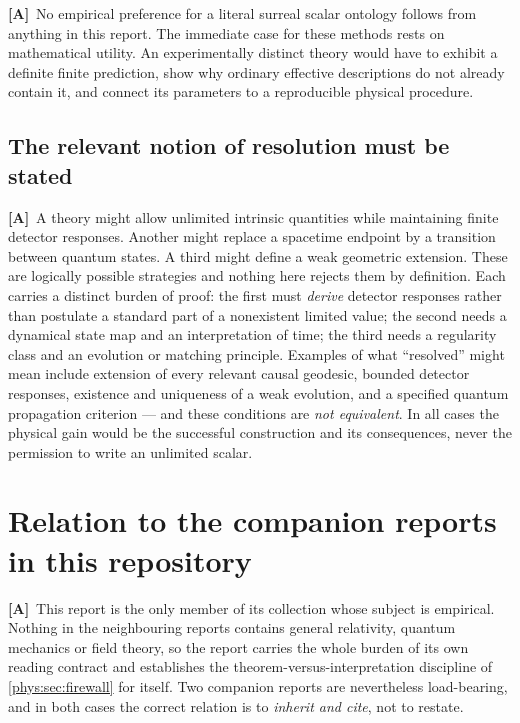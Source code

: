 \documentclass[11pt,letterpaper]{article}
\numberwithin{equation}{section}
\theoremstyle{definition}
\theoremstyle{remark}
\newcommand{\TA}{\textcolor{TierA}{\textsf{\bfseries[A]}}}
\begin{document}
\TA\ No empirical preference for a literal surreal scalar ontology follows from
anything in this report. The immediate case for these methods rests on
mathematical utility. An experimentally distinct theory would have to exhibit a
definite finite prediction, show why ordinary effective descriptions do not
already contain it, and connect its parameters to a reproducible physical
procedure.

\subsection{The relevant notion of resolution must be stated}
\label{phys:sub:notionofresolution}

\TA\ A theory might allow unlimited intrinsic quantities while maintaining
finite detector responses. Another might replace a spacetime endpoint by a
transition between quantum states. A third might define a weak geometric
extension. These are logically possible strategies and nothing here rejects
them by definition. Each carries a distinct burden of proof: the first must
\emph{derive} detector responses rather than postulate a standard part of a
nonexistent limited value; the second needs a dynamical state map and an
interpretation of time; the third needs a regularity class and an evolution or
matching principle. Examples of what ``resolved'' might mean include extension
of every relevant causal geodesic, bounded detector responses, existence and
uniqueness of a weak evolution, and a specified quantum propagation criterion
--- and these conditions are \emph{not equivalent}. In all cases the physical
gain would be the successful construction and its consequences, never the
permission to write an unlimited scalar.

\section{Relation to the companion reports in this repository}
\label{phys:sec:companions}

\TA\ This report is the only member of its collection whose subject is
empirical. Nothing in the neighbouring reports contains general relativity,
quantum mechanics or field theory, so the report carries the whole burden of
its own reading contract and establishes the theorem-versus-interpretation
discipline of \cref{phys:sec:firewall} for itself. Two companion reports are
nevertheless load-bearing, and in both cases the correct relation is to
\emph{inherit and cite}, not to restate.
\end{document}

